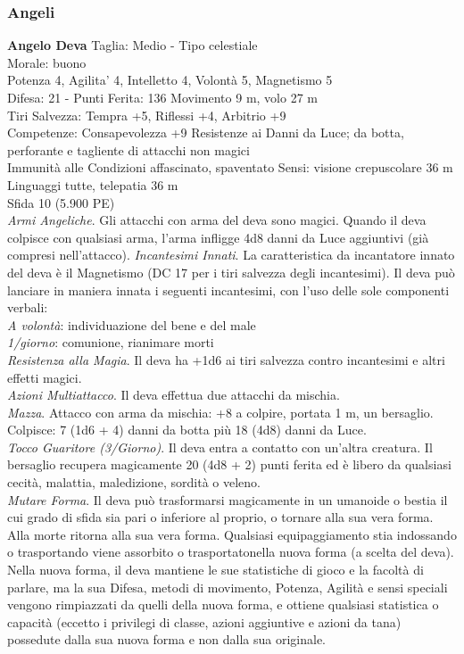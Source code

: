 \begin{multicols}{2}
\subsubsection{Angeli}
\medskip\textbf{Angelo Deva}
Taglia: Medio  - \hspace*{0pt}\hfill{Tipo celestiale}\\
Morale: buono\\
Potenza 4, Agilita' 4, Intelletto 4, Volontà 5, Magnetismo 5\\
Difesa: 21 - \hspace*{0pt}\hfill{Punti Ferita: 136}
Movimento 9 m, volo 27 m\\
Tiri Salvezza: Tempra +5, Riflessi +4, Arbitrio +9\\
Competenze: Consapevolezza +9
Resistenze ai Danni da Luce; da botta, perforante e tagliente di attacchi non magici\\
Immunità alle Condizioni affascinato, spaventato
Sensi: visione crepuscolare 36 m\\
Linguaggi tutte, telepatia 36 m\\
Sfida 10 (5.900 PE)\\
\textit{Armi Angeliche}. Gli attacchi con arma del deva sono magici. Quando il deva colpisce con qualsiasi arma, l’arma infligge 4d8 danni da Luce aggiuntivi (già compresi nell’attacco).
\textit{Incantesimi Innati}. La caratteristica da incantatore innato del deva è il Magnetismo (DC 17 per i tiri salvezza degli incantesimi). Il deva può lanciare in maniera innata i seguenti incantesimi, con l’uso delle sole componenti verbali:\\
\textit{A volontà}: individuazione del bene e del male\\
\textit{1/giorno}: comunione, rianimare morti\\
\textit{Resistenza alla Magia}. Il deva ha +1d6 ai tiri salvezza contro incantesimi e altri effetti magici.\\
\textit{Azioni Multiattacco}. Il deva effettua due attacchi da mischia.\\
\textit{Mazza}. Attacco con arma da mischia: +8 a colpire, portata 1 m, un bersaglio.
Colpisce: 7 (1d6 + 4) danni da botta più 18 (4d8) danni da Luce. \\
\textit{Tocco Guaritore (3/Giorno)}. Il deva entra a contatto con un’altra creatura. Il bersaglio recupera magicamente 20 (4d8 + 2) punti ferita ed è libero da qualsiasi cecità, malattia, maledizione, sordità o veleno.\\
\textit{Mutare Forma}. Il deva può trasformarsi magicamente in un umanoide o bestia il cui grado di sfida sia pari o inferiore al proprio, o tornare alla sua vera forma. Alla morte ritorna alla sua vera forma. Qualsiasi equipaggiamento stia indossando o trasportando viene assorbito o trasportatonella nuova forma (a scelta del deva).  Nella nuova forma, il deva mantiene le sue statistiche di gioco e la facoltà di parlare, ma la sua Difesa, metodi di movimento, Potenza,
Agilità e sensi speciali vengono rimpiazzati da quelli della nuova forma, e ottiene qualsiasi statistica o capacità (eccetto i privilegi di classe, azioni aggiuntive e azioni da tana) possedute dalla sua nuova forma e non dalla sua originale.


\end{multicols}
